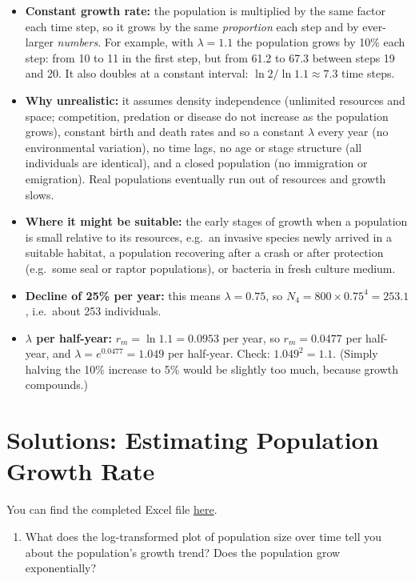 \documentclass[
  a4paper]{book}
\providecommand{\tightlist}{%
  \setlength{\itemsep}{0pt}\setlength{\parskip}{0pt}}
\begin{document}
\begin{itemize}
\tightlist
\item
  \textbf{Constant growth rate:} the population is multiplied by the same factor each time step, so it grows by the same \emph{proportion} each step and by ever-larger \emph{numbers}. For example, with \(\lambda = 1.1\) the population grows by 10\% each step: from 10 to 11 in the first step, but from 61.2 to 67.3 between steps 19 and 20. It also doubles at a constant interval: \(\ln 2 / \ln 1.1 \approx 7.3\) time steps.
\item
  \textbf{Why unrealistic:} it assumes density independence (unlimited resources and space; competition, predation or disease do not increase as the population grows), constant birth and death rates and so a constant \(\lambda\) every year (no environmental variation), no time lags, no age or stage structure (all individuals are identical), and a closed population (no immigration or emigration). Real populations eventually run out of resources and growth slows.
\item
  \textbf{Where it might be suitable:} the early stages of growth when a population is small relative to its resources, e.g.~an invasive species newly arrived in a suitable habitat, a population recovering after a crash or after protection (e.g.~some seal or raptor populations), or bacteria in fresh culture medium.
\item
  \textbf{Decline of 25\% per year:} this means \(\lambda = 0.75\), so \(N_4 = 800 \times 0.75^4 = 253.1\), i.e.~about 253 individuals.
\item
  \textbf{\(\lambda\) per half-year:} \(r_m = \ln 1.1 = 0.0953\) per year, so \(r_m = 0.0477\) per half-year, and \(\lambda = e^{0.0477} = 1.049\) per half-year. Check: \(1.049^2 = 1.1\). (Simply halving the 10\% increase to 5\% would be slightly too much, because growth compounds.)
\end{itemize}

\section{Solutions: Estimating Population Growth Rate}\label{solutions-estimating-population-growth-rate}

You can find the completed Excel file \href{https://www.dropbox.com/scl/fi/sxvtkuwxs0mn9ohgwh0ot/EstimatingGrowth_completed.xlsx?rlkey=lzefpmqt3ishxze4weoy9nz65&dl=1}{here}.

\begin{enumerate}
\def\labelenumi{\arabic{enumi}.}
\tightlist
\item
  What does the log-transformed plot of population size over time tell you about the population's growth trend? Does the population grow exponentially?
\end{enumerate}
\end{document}
